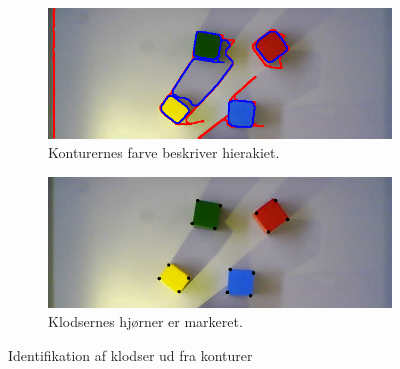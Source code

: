 \begin{figure}[H]
	\centering
	\begin{subfigure}{.45\textwidth}
		\centering
		\includegraphics[scale=0.3]{images/contours}
		\caption{Konturernes farve beskriver hierakiet.}
	  	\label{fig:contours}
	\end{subfigure}
	\begin{subfigure}{.45\textwidth}
		\centering
		\includegraphics[scale=0.3]{images/blocks}
		\caption{Klodsernes hjørner er markeret.}
		\label{fig:blocks}
	\end{subfigure}
	\caption{Identifikation af klodser ud fra konturer}
	\label{fig:identification}
\end{figure}